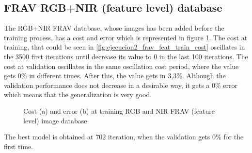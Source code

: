 \subsection{FRAV RGB+NIR (feature level) database}
The RGB+NIR FRAV database, whose images has been added before the training process, has a cost and error which is represented in figure \ref{fig:ejecucion2_frav_feat_train}. The cost at training, that could be seen in \ref{fig:ejecucion2_frav_feat_train_cost} oscillates in the 3500 first iterations until decrease its value to 0 in the last 100 iterations. The cost at validation oscillates in the same oscillation cost period, where the value gets 0\% in different times. After this, the value gets in 3,3\%. Although the validation performance does not decrease in a desirable way, it gets a 0\% error which means that the generalization is very good.\\
\begin{figure}[htb]
\centering
\caption{Cost (a) and error (b) at training RGB and NIR FRAV (feature level) image database}
\label{fig:ejecucion2_frav_feat_train}
\end{figure}

The best model is obtained at 702 iteration, when the validation gets 0\% for the first time.\\

